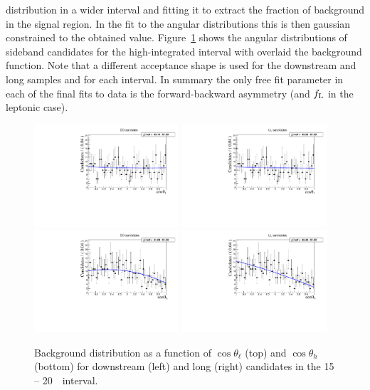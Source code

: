 distribution in a wider interval and fitting it to extract the fraction of background in the signal region.
In the fit to the angular distributions this is then gaussian constrained to the obtained value.
%
Figure~\ref{fig:cosThetaLbkg} shows the angular distributions of sideband candidates
for the high-\qsq integrated interval with overlaid the background function.
Note that a different acceptance shape is used for the downstream and long samples and for each \qsq interval.
%
In summary the only free fit parameter in each of the final fits to data is the forward-backward asymmetry
(and $f_{\rm L}$ in the leptonic case). 
%
\begin{figure}[h]
\centering
\includegraphics[width=0.48\textwidth]{Lmumu/figs/AngularBkgFits/BkgFit_highq2_DD.pdf}
\includegraphics[width=0.48\textwidth]{Lmumu/figs/AngularBkgFits/BkgFit_highq2_LL.pdf}
\includegraphics[width=0.48\textwidth]{Lmumu/figs/AngularBkgFits/BkgFitB_highq2_DD.pdf}
\includegraphics[width=0.48\textwidth]{Lmumu/figs/AngularBkgFits/BkgFitB_highq2_LL.pdf}
\caption{Background distribution as a function of $\cos\theta_\ell$ (top) and $\cos\theta_h$ (bottom)
for downstream (left) and long (right) candidates in the 15 -- 20~\gevgevcccc ~\qsq interval.  }
\label{fig:cosThetaLbkg}
\end{figure}


